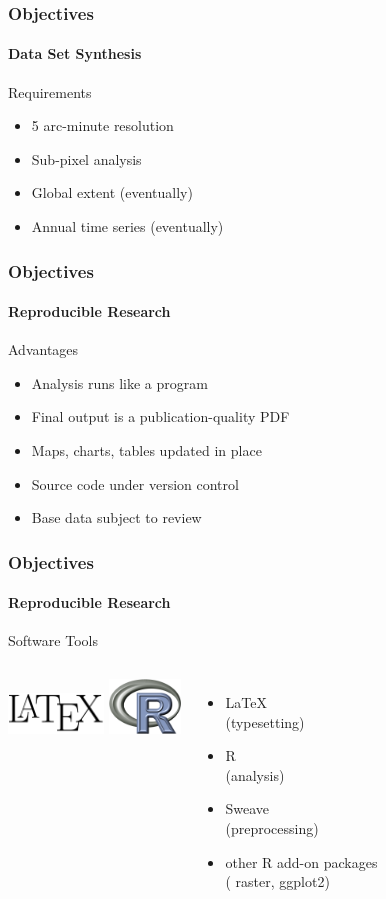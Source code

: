 \documentclass{beamer}
\begin{document}
\begin{frame}
  \frametitle{Objectives}
  \framesubtitle{Data Set Synthesis}
  Requirements
  \begin{itemize}
  \item 
    5 arc-minute resolution
    \pause
  \item 
    Sub-pixel analysis
    \pause
  \item 
    Global extent (eventually)
    \pause
  \item 
    Annual time series (eventually)
  \end{itemize}
\end{frame}


\begin{frame}
  \frametitle{Objectives}
  \framesubtitle{Reproducible Research}
  Advantages
  \begin{itemize}
  \item 
    Analysis runs like a program
    \pause
  \item 
    Final output is a publication-quality PDF
    \pause
  \item 
    Maps, charts, tables updated in place
    \pause
  \item 
    Source code under version control
    \pause
  \item 
    Base data subject to review 
  \end{itemize}
\end{frame}


\begin{frame}
  \frametitle{Objectives}
  \framesubtitle{Reproducible Research}
  Software Tools
  \begin{columns}[c]
    \column{1.0in}
    \includegraphics[width=1.0in]{latex}
    \vspace{0.5in}
    \includegraphics[width=0.75in]{r}
    \column{2.0in}  
    \begin{itemize}
    \item 
      \LaTeX \\ (typesetting)
      \pause
    \item 
      R \\ (analysis) 
      \pause
    \item 
      Sweave \\ (preprocessing)
      \pause
    \item 
      other R add-on packages \\
      ( raster, ggplot2)
    \end{itemize}
  \end{columns}
\end{frame}
\end{document}
